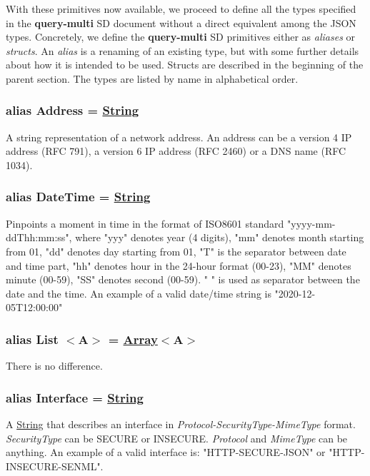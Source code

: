 \documentclass[a4paper]{arrowhead}
\newcommand{\pdef}[1]{{\textcolor{ArrowheadGrey}{#1 \label{sec:model:primitives:#1} \label{sec:model:primitives:#1s}}}}
\newcommand{\pref}[1]{{\textcolor{ArrowheadGrey}{\hyperref[sec:model:primitives:#1]{#1}}}}
\begin{document}
With these primitives now available, we proceed to define all the types specified in the \textbf{query-multi} SD document without a direct equivalent among the JSON types.
Concretely, we define the \textbf{query-multi} SD primitives either as \textit{aliases} or \textit{structs}.
An \textit{alias} is a renaming of an existing type, but with some further details about how it is intended to be used.
Structs are described in the beginning of the parent section.
The types are listed by name in alphabetical order.

\subsubsection{alias \pdef{Address} = \pref{String}}

A string representation of a network address. An address can be a version 4 IP address (RFC 791), a version 6 IP address (RFC 2460) or a DNS name (RFC 1034).

\subsubsection{alias \pdef{DateTime} = \pref{String}}

Pinpoints a moment in time in the format of ISO8601 standard "yyyy-mm-ddThh:mm:ss", where "yyy" denotes year (4 digits), "mm" denotes month starting from 01, "dd" denotes day starting from 01, "T" is the separator between date and time part, "hh" denotes hour in the 24-hour format (00-23), "MM" denotes minute (00-59), "SS" denotes second (00-59). " " is used as separator between the date and the time.
An example of a valid date/time string is "2020-12-05T12:00:00"

\subsubsection{alias \pdef{List}$<$A$>$ = \pref{Array}$<$A$>$}
There is no difference.

\subsubsection{alias \pdef{Interface} = \pref{String}}

A \pref{String} that describes an interface in \textit{Protocol-SecurityType-MimeType} format. \textit{SecurityType} can be SECURE or INSECURE. \textit{Protocol} and \textit{MimeType} can be anything. An example of a valid interface is: "HTTP-SECURE-JSON" or "HTTP-INSECURE-SENML".
\end{document}
